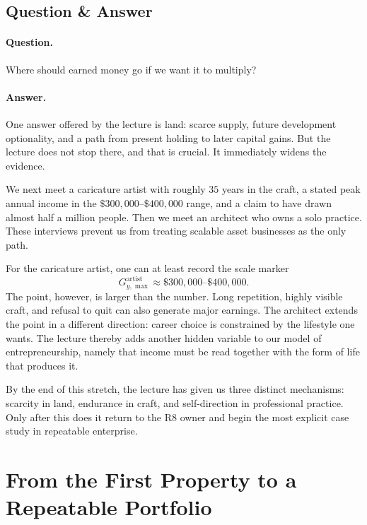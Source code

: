 \subsection{Question \& Answer}

\paragraph{Question.}
Where should earned money go if we want it to multiply?

\paragraph{Answer.}
One answer offered by the lecture is land: scarce supply, future development optionality, and a path from present holding to later capital gains. But the lecture does not stop there, and that is crucial. It immediately widens the evidence.

We next meet a caricature artist with roughly \(35\) years in the craft, a stated peak annual income in the \(\$300{,}000\text{--}\$400{,}000\) range, and a claim to have drawn almost half a million people. Then we meet an architect who owns a solo practice. These interviews prevent us from treating scalable asset businesses as the only path.

For the caricature artist, one can at least record the scale marker
\begin{equation}
G_{y,\max}^{\mathrm{artist}} \approx \$300{,}000\text{--}\$400{,}000.
\end{equation}
The point, however, is larger than the number. Long repetition, highly visible craft, and refusal to quit can also generate major earnings. The architect extends the point in a different direction: career choice is constrained by the lifestyle one wants. The lecture thereby adds another hidden variable to our model of entrepreneurship, namely that income must be read together with the form of life that produces it.

By the end of this stretch, the lecture has given us three distinct mechanisms: scarcity in land, endurance in craft, and self-direction in professional practice. Only after this does it return to the R8 owner and begin the most explicit case study in repeatable enterprise.

\section{From the First Property to a Repeatable Portfolio}


